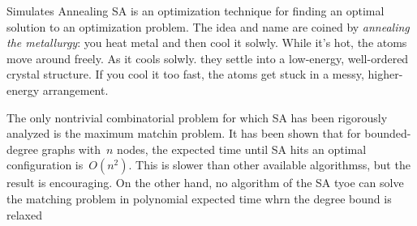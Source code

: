 \documentclass[11pt, aspectratio=169]{beamer}
\begin{document}
\begin{frame}{Simulates Annealing}
  SA \cite{Bertsimas1993Simulated,Henderson2003Simulated} is an optimization technique for finding an optimal solution to an optimization problem.
  The idea and name are coined by \emph{annealing the metallurgy}: you heat metal and then cool it solwly.
  While it's hot, the atoms move around freely.
  As it cools solwly. they settle into a low-energy, well-ordered crystal structure.
  If you cool it too fast, the atoms get stuck in a messy, higher-energy arrangement.

  The only nontrivial combinatorial problem for which SA has been rigorously analyzed is the maximum matchin problem.
  It has been shown that for bounded-degree graphs with~$n$ nodes, the expected time until SA hits an optimal configuration is~$O(n^{2})$.
  This is slower than other available algorithmss, but the result is encouraging.
  On the other hand, no algorithm of the SA tyoe can solve the matching problem in polynomial expected time whrn the degree bound is relaxed \cite{Bertsimas1993Simulated}
\end{frame}

\begin{frame}
  
\end{frame}


\begin{frame}
  
  
\end{frame}


\begin{frame}
\end{frame}
\end{document}
